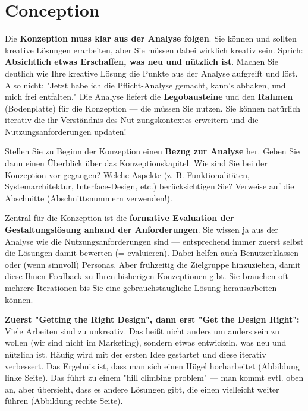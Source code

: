 \documentclass[11pt,a4paper,english]{scrreprt}
\newenvironment{comment}
  {\par\medskip
   \begingroup\color{olive}%
   }
 {\endgroup
  \medskip}
\begin{document}
\chapter{Conception}\label{chapter:conception}
\begin{comment}
Die \textbf{Konzeption muss klar aus der Analyse folgen}. Sie können und sollten kreative Lösungen erarbeiten, aber Sie müssen dabei wirklich kreativ sein. Sprich: \textbf{Absichtlich etwas Erschaffen, was neu und nützlich ist}. Machen Sie deutlich wie Ihre kreative Lösung die Punkte aus der Analyse aufgreift und löst. Also nicht: "Jetzt habe ich die Pflicht-Analyse gemacht, kann's abhaken, und mich frei entfalten." Die Analyse liefert die \textbf{Legobausteine} und den \textbf{Rahmen} (Bodenplatte) für die Konzeption — die müssen Sie nutzen. Sie können natürlich iterativ die ihr Verständnis des Nut-zungskontextes erweitern und die Nutzungsanforderungen updaten!

Stellen Sie zu Beginn der Konzeption einen \textbf{Bezug zur Analyse} her. Geben Sie dann einen Überblick über das Konzeptionskapitel. Wie sind Sie bei der Konzeption vor-gegangen? Welche Aspekte (z. B. Funktionalitäten, Systemarchitektur, Interface-Design, etc.) berücksichtigen Sie? Verweise auf die Abschnitte (Abschnittsnummern verwenden!).

Zentral für die Konzeption ist die \textbf{formative Evaluation der Gestaltungslösung anhand der Anforderungen}. Sie wissen ja aus der Analyse wie die Nutzungsanforderungen sind — entsprechend immer zuerst selbst die Lösungen damit bewerten (= evaluieren). Dabei helfen auch Benutzerklassen oder (wenn sinnvoll) Personas. Aber frühzeitig die Zielgruppe hinzuziehen, damit diese Ihnen Feedback zu Ihren bisherigen Konzeptionen gibt. Sie brauchen oft mehrere Iterationen bis Sie eine gebrauchstaugliche Lösung herausarbeiten können.

\textbf{Zuerst "Getting the Right Design", dann erst "Get the Design Right":} Viele Arbeiten sind zu unkreativ. Das heißt nicht anders um anders sein zu wollen (wir sind nicht im Marketing), sondern etwas entwickeln, was neu und nützlich ist. Häufig wird mit der ersten Idee gestartet und diese iterativ verbessert. Das Ergebnis ist, dass man sich einen Hügel hocharbeitet (Abbildung linke Seite). Das führt zu einem "hill climbing problem" — man kommt evtl. oben an, aber übersieht, dass es andere Lösungen gibt, die einen vielleicht weiter führen (Abbildung rechte Seite).


\end{comment}
\end{document}

